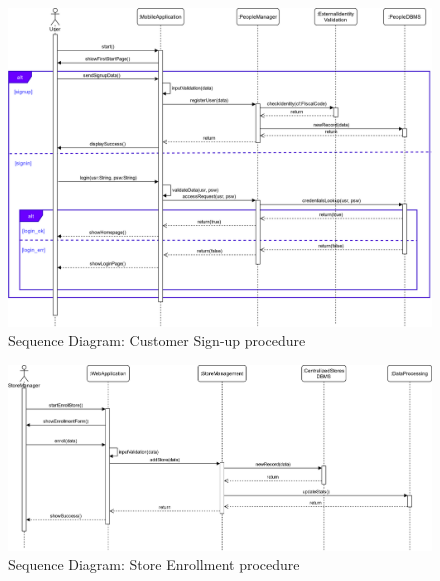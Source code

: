 \begin{figure}[H]
	\includegraphics[width=\linewidth]{../Diagrams/Sequence/sequence_customer_signup.png}
	\caption{Sequence Diagram: Customer Sign-up procedure}
	\label{fig:sCusSign}
\end{figure}

\begin{figure}[H]
	\includegraphics[width=\linewidth]{../Diagrams/Sequence/sequence_store_enroll.png}
	\caption{Sequence Diagram: Store Enrollment procedure}
	\label{fig:sStoreEn}
\end{figure}

